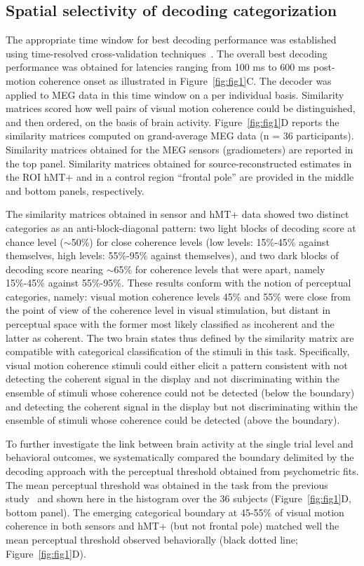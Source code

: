 \subsection*{Spatial selectivity of decoding categorization}
The appropriate time window for best decoding performance was established using time-resolved cross-validation techniques~\cite{21ramkumar2013feature}. The overall best decoding performance was obtained for latencies ranging from 100 ms to 600 ms post-motion coherence onset as illustrated in Figure~\ref{fig:fig1}C. The decoder was applied to MEG data in this time window on a per individual basis. Similarity matrices scored how well pairs of visual motion coherence could be distinguished, and then ordered, on the basis of brain activity. Figure~\ref{fig:fig1}D reports the similarity matrices computed on grand-average MEG data (n = 36 participants). Similarity matrices obtained for the MEG sensors (gradiometers) are reported in the top panel. Similarity matrices obtained for source-reconstructed estimates in the ROI hMT+ and in a control region “frontal pole” are provided in the middle and bottom panels, respectively. 

The similarity matrices obtained in sensor and hMT+ data showed two distinct categories as an anti-block-diagonal pattern: two light blocks of decoding score at chance level ($\sim$50\%) for close coherence levels (low levels: 15\%-45\% against themselves, high levels: 55\%-95\% against themselves), and two dark blocks of decoding score nearing $\sim$65\% for coherence levels that were apart, namely 15\%-45\% against 55\%-95\%. These results conform with the notion of perceptual categories, namely: visual motion coherence levels 45\% and 55\% were close from the point of view of the coherence level in visual stimulation, but distant in perceptual space with the former most likely classified as incoherent and the latter as coherent. The two brain states thus defined by the similarity matrix are compatible with categorical classification of the stimuli in this task. Specifically, visual motion coherence stimuli could either elicit a pattern consistent with not detecting the coherent signal in the display and not discriminating within the ensemble of stimuli whose coherence could not be detected (below the boundary) and detecting the coherent signal in the display but not discriminating within the ensemble of stimuli whose coherence could be detected (above the boundary).

To further investigate the link between brain activity at the single trial level and  behavioral outcomes, we systematically compared the boundary delimited by the decoding approach with the perceptual threshold obtained from psychometric fits. The mean perceptual threshold was obtained in the task from the previous study~\cite{23zilber2014supramodal} and shown here in the histogram over the 36 subjects (Figure~\ref{fig:fig1}D, bottom panel). The emerging categorical boundary at 45-55\% of visual motion coherence in both sensors and hMT+ (but not frontal pole) matched well the mean perceptual threshold observed behaviorally (black dotted line; Figure~\ref{fig:fig1}D). 


